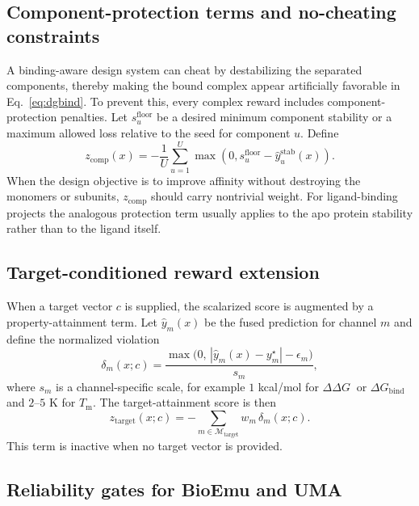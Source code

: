 \documentclass[11pt]{article}
\newcommand{\ddG}{\ensuremath{\Delta\Delta G \ }}
\newcommand{\Tm}{\ensuremath{T_{\mathrm m}}}
\newcommand{\dGbind}{\ensuremath{\Delta G_{\mathrm{bind}}}}
\begin{document}
\subsection{Component-protection terms and no-cheating constraints}

A binding-aware design system can cheat by destabilizing the separated components, thereby making the bound complex appear artificially favorable in Eq.~\eqref{eq:dgbind}. To prevent this, every complex reward includes component-protection penalties. Let $s_u^{\mathrm{floor}}$ be a desired minimum component stability or a maximum allowed loss relative to the seed for component $u$. Define
\begin{equation}
    z_{\mathrm{comp}}(x) = -\frac{1}{U}\sum_{u=1}^{U}\max\!\left(0, s_u^{\mathrm{floor}}-\widehat y_u^{\mathrm{stab}}(x)\right).
\end{equation}
When the design objective is to improve affinity without destroying the monomers or subunits, $z_{\mathrm{comp}}$ should carry nontrivial weight. For ligand-binding projects the analogous protection term usually applies to the apo protein stability rather than to the ligand itself.

\subsection{Target-conditioned reward extension}

When a target vector $c$ is supplied, the scalarized score is augmented by a property-attainment term. Let $\widehat y_m(x)$ be the fused prediction for channel $m$ and define the normalized violation
\begin{equation}
\label{eq:targetviol}
    \delta_m(x;c)=\frac{\max\big(0,\,|\widehat y_m(x)-y_m^{\star}|-\epsilon_m\big)}{s_m},
\end{equation}
where $s_m$ is a channel-specific scale, for example $1$ kcal/mol for $\ddG$ or $\dGbind$ and $2$--$5$ K for $\Tm$. The target-attainment score is then
\begin{equation}
    z_{\mathrm{target}}(x;c)=-\sum_{m\in\mathcal{M}_{\mathrm{target}}} w_m\,\delta_m(x;c).
\end{equation}
This term is inactive when no target vector is provided.

\subsection{Reliability gates for BioEmu and UMA}
\end{document}

